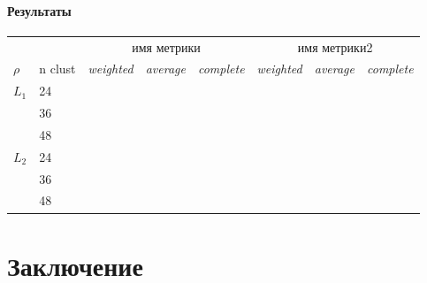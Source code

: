 \documentclass[12pt,twoside]{article}
\begin{document}
        \paragraph{Результаты}
            \begin{center}
                \begin{tabular}{ll|rrr|rrr}  
                    \toprule
                    & & \multicolumn{3}{c}{имя метрики} & \multicolumn{3}{c}{имя метрики2} \\
                    \cmidrule(r){3-8}
                $\rho$    & n clust & \textit{weighted} & \textit{average} & \textit{complete} & \textit{weighted} & \textit{average} & \textit{complete} \\
                    \midrule
                $L_1$   & 24    &    &   &   &    &   &   \\
                        & 36    &    &   &   &    &   &   \\
                        & 48    &    &   &   &    &   &   \\
                $L_2$   & 24    &    &   &   &    &   &   \\
                        & 36    &    &   &   &    &   &   \\
                        & 48    &    &   &   &    &   &   \\
                \bottomrule
                \end{tabular}
            \end{center}

    \section{Заключение}

	 
    
    
\end{document}
